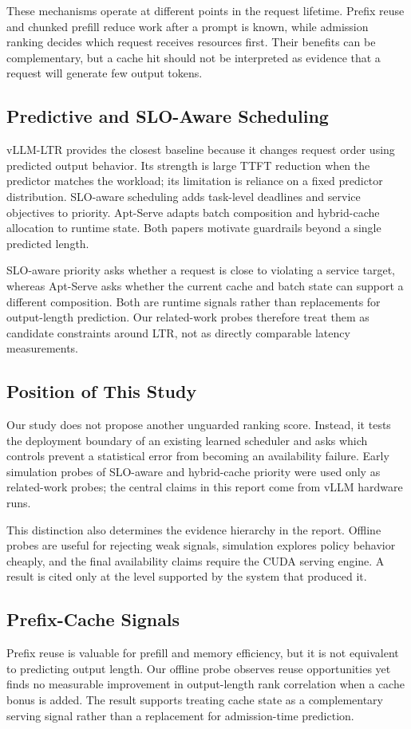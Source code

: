 \documentclass[conference]{IEEEtran}
\begin{document}
These mechanisms operate at different points in the request lifetime. Prefix reuse and chunked prefill reduce work after a prompt is known, while admission ranking decides which request receives resources first. Their benefits can be complementary, but a cache hit should not be interpreted as evidence that a request will generate few output tokens.

\subsection{Predictive and SLO-Aware Scheduling}
vLLM-LTR \cite{fu2024ltr} provides the closest baseline because it changes request order using predicted output behavior. Its strength is large TTFT reduction when the predictor matches the workload; its limitation is reliance on a fixed predictor distribution. SLO-aware scheduling \cite{huang2025slo} adds task-level deadlines and service objectives to priority. Apt-Serve \cite{gao2025aptserve} adapts batch composition and hybrid-cache allocation to runtime state. Both papers motivate guardrails beyond a single predicted length.

SLO-aware priority asks whether a request is close to violating a service target, whereas Apt-Serve asks whether the current cache and batch state can support a different composition. Both are runtime signals rather than replacements for output-length prediction. Our related-work probes therefore treat them as candidate constraints around LTR, not as directly comparable latency measurements.

\subsection{Position of This Study}
Our study does not propose another unguarded ranking score. Instead, it tests the deployment boundary of an existing learned scheduler and asks which controls prevent a statistical error from becoming an availability failure. Early simulation probes of SLO-aware and hybrid-cache priority were used only as related-work probes; the central claims in this report come from vLLM hardware runs.

This distinction also determines the evidence hierarchy in the report. Offline probes are useful for rejecting weak signals, simulation explores policy behavior cheaply, and the final availability claims require the CUDA serving engine. A result is cited only at the level supported by the system that produced it.

\subsection{Prefix-Cache Signals}
Prefix reuse is valuable for prefill and memory efficiency, but it is not equivalent to predicting output length. Our offline probe observes reuse opportunities yet finds no measurable improvement in output-length rank correlation when a cache bonus is added. The result supports treating cache state as a complementary serving signal rather than a replacement for admission-time prediction.
\end{document}
